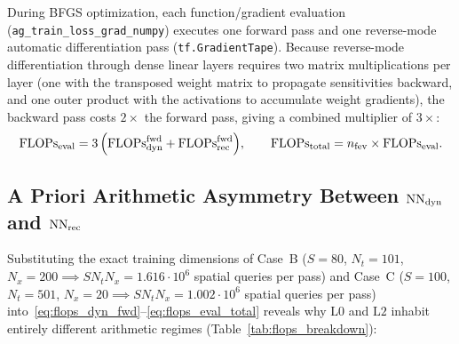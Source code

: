 During BFGS optimization, each function/gradient evaluation (\texttt{ag\_train\_loss\_grad\_numpy}) executes one forward pass and one reverse-mode automatic differentiation pass (\texttt{tf.GradientTape}). Because reverse-mode differentiation through dense linear layers requires two matrix multiplications per layer (one with the transposed weight matrix to propagate sensitivities backward, and one outer product with the activations to accumulate weight gradients), the backward pass costs $2\times$ the forward pass, giving a combined multiplier of $3\times$:
\begin{equation}
  \mathrm{FLOPs}_{\mathrm{eval}} = 3\,\Big(\mathrm{FLOPs}_{\mathrm{dyn}}^{\mathrm{fwd}} + \mathrm{FLOPs}_{\mathrm{rec}}^{\mathrm{fwd}}\Big), \qquad
  \mathrm{FLOPs}_{\mathrm{total}} = n_{\mathrm{fev}} \times \mathrm{FLOPs}_{\mathrm{eval}}.
  \label{eq:flops_eval_total}
\end{equation}

\subsection{A Priori Arithmetic Asymmetry Between \texorpdfstring{$\mathrm{NN}_{\mathrm{dyn}}$}{NNdyn} and \texorpdfstring{$\mathrm{NN}_{\mathrm{rec}}$}{NNrec}}

Substituting the exact training dimensions of Case~B ($S = 80$, $N_t = 101$, $N_x = 200 \implies S N_t N_x = 1.616\cdot 10^6$ spatial queries per pass) and Case~C ($S = 100$, $N_t = 501$, $N_x = 20 \implies S N_t N_x = 1.002\cdot 10^6$ spatial queries per pass) into~\eqref{eq:flops_dyn_fwd}--\eqref{eq:flops_eval_total} reveals why $\mathrm{L0}$ and $\mathrm{L2}$ inhabit entirely different arithmetic regimes (Table~\ref{tab:flops_breakdown}):

